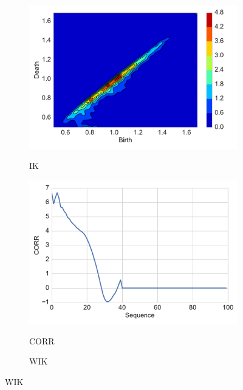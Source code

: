 \documentclass[12pt]{article}
\begin{document}
\begin{figure}[htbp]
\begin{subfigure}{.24\textwidth}
    \label{fig:examplestest4}
  \end{subfigure}
    \begin{subfigure}{.24\textwidth}
    \centering
        \caption{IK}
        \includegraphics[width=\linewidth]{figure_5_kernel.pdf}
    \label{fig:examplestest5}
  \end{subfigure}
    \begin{subfigure}{.24\textwidth}
    \centering
        \caption{CORR}  \includegraphics[width=\linewidth]{figure_5_corr_fun.pdf}
    \label{fig:examplestest6}
  \end{subfigure}
    \begin{subfigure}{.24\textwidth}
    \centering
        \caption{WIK}

\end{subfigure}
\end{figure}
\end{document}
